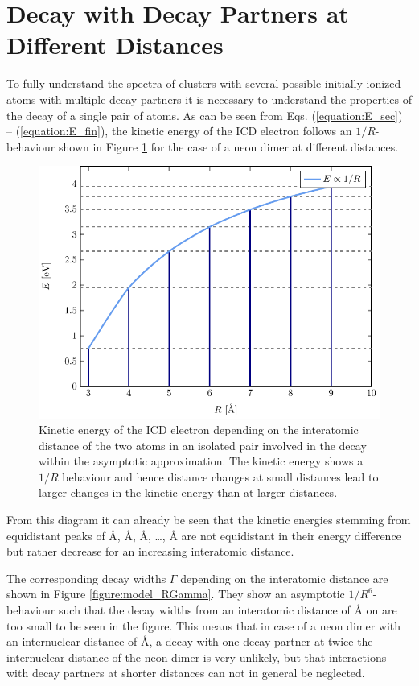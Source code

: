 \section{Decay with Decay Partners at Different Distances}
\label{sec:partners}

To fully understand the spectra of clusters with several possible
initially ionized atoms with multiple decay partners it is necessary to
understand the properties of the decay of a single pair of atoms. As can be seen
from Eqs. (\ref{equation:E_sec}) -- (\ref{equation:E_fin}),
the kinetic energy of the ICD electron follows an
$1/R$-behaviour shown in Figure \ref{figure:model_RE} for the case
of a neon dimer at different distances.

\begin{figure}[h]
 \centering
 \includegraphics[width=\columnwidth]{pics/model_RE.pdf}
 \caption{Kinetic energy of the ICD electron depending on the interatomic
          distance of the two atoms in an isolated pair
          involved in the decay within the
          asymptotic approximation. The kinetic energy shows a $1/R$
          behaviour and hence distance changes at small distances lead
          to larger changes in the kinetic energy than at larger distances.}
 \label{figure:model_RE}
\end{figure}
From this diagram it can already be
seen that the kinetic energies stemming from equidistant peaks of
\unit[3]{\AA}, \unit[4]{\AA}, \unit[5]{\AA}, \dots , \unit[9]{\AA} are
not equidistant in their energy difference but rather decrease for
an increasing interatomic distance.

The corresponding decay widths $\Gamma$ depending on the interatomic
distance are shown in Figure \ref{figure:model_RGamma}. They show an
asymptotic $1/R^6$-behaviour such that the decay widths from an interatomic
distance of \unit[7]{\AA} on are too small to be seen in the
figure. This means that in case of a neon dimer with an internuclear distance
of \unit[3]{\AA}, a decay with one decay partner at twice the internuclear
distance of the neon dimer is very unlikely, but that interactions with
decay partners at shorter distances can not in general be neglected.


